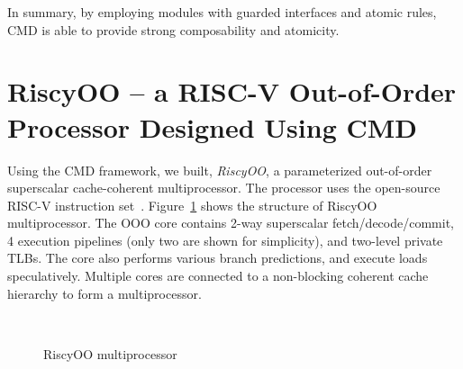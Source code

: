 \documentclass[conference]{IEEEtran}
\begin{document}
In summary, by employing modules with guarded interfaces and atomic rules, CMD is able to provide strong composability and atomicity.


\section{RiscyOO -- a RISC-V Out-of-Order Processor Designed Using CMD}\label{sec:ooo}
Using the CMD framework, we built, \emph{RiscyOO}, a parameterized out-of-order superscalar cache-coherent multiprocessor.
The processor uses the open-source RISC-V instruction set~\cite{riscv}.
Figure~\ref{fig:ooo} shows the structure of RiscyOO multiprocessor.
The OOO core contains 2-way superscalar fetch/decode/commit, 4 execution pipelines (only two are shown for simplicity), and two-level private TLBs.
The core also performs various branch predictions, and execute loads speculatively.
Multiple cores are connected to a non-blocking coherent cache hierarchy to form a multiprocessor.

\begin{figure}[!htb]
    \centering
    \\
    \caption{RiscyOO multiprocessor}\label{fig:ooo}
\end{figure}
\end{document}

